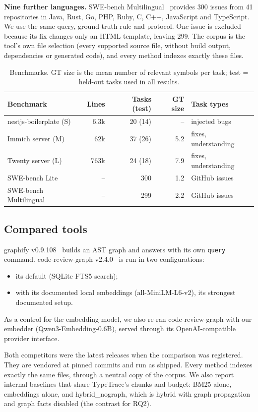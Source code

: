 \documentclass[sigconf,nonacm]{acmart}
\newcommand{\tool}{TypeTrace\xspace}
\newcommand{\gfy}{graphify\xspace}
\newcommand{\crg}{code-review-graph\xspace}
\newcommand{\hyb}{\textsf{hybrid}\xspace}
\newcommand{\nog}{\textsf{hybrid\_nograph}\xspace}
\begin{document}
\textbf{Nine further languages.} SWE-bench Multilingual~\cite{yang2025swesmith} provides 300 issues from 41 repositories in Java, Rust, Go, PHP, Ruby, C, C++, JavaScript and TypeScript. We use the same query, ground-truth rule and protocol. One issue is excluded because its fix changes only an HTML template, leaving 299. The corpus is the tool's own file selection (every supported source file, without build output, dependencies or generated code), and every method indexes exactly these files.

\begin{table}[t]
\caption{Benchmarks. GT size is the mean number of relevant symbols per task; test = held-out tasks used in all results.}
\label{tab:benchmarks}
\small
\begin{tabular}{@{}lrrrl@{}}
\toprule
Benchmark & Lines & Tasks (test) & GT size & Task types \\
\midrule
nestjs-boilerplate (S) & 6.3k & 20 (14) & -- & injected bugs \\
Immich server (M) & 62k & 37 (26) & 5.2 & fixes, understanding \\
Twenty server (L) & 763k & 24 (18) & 7.9 & fixes, understanding \\
SWE-bench Lite & -- & 300 & 1.2 & GitHub issues \\
SWE-bench Multilingual & -- & 299 & 2.2 & GitHub issues \\
\bottomrule
\end{tabular}
\end{table}

\subsection{Compared tools}

\gfy v0.9.108~\cite{graphify} builds an AST graph and answers with its own \texttt{query} command. \crg v2.4.0~\cite{crg} is run in two configurations:
\begin{itemize}
\item its default (SQLite FTS5 search);
\item with its documented local embeddings (all-MiniLM-L6-v2), its strongest documented setup.
\end{itemize}
As a control for the embedding model, we also re-ran \crg with our embedder (Qwen3-Embedding-0.6B), served through its OpenAI-compatible provider interface.

Both competitors were the latest releases when the comparison was registered. They are vendored at pinned commits and run as shipped. Every method indexes exactly the same files, through a neutral copy of the corpus. We also report internal baselines that share \tool's chunks and budget: BM25 alone, embeddings alone, and \nog, which is \hyb with graph propagation and graph facts disabled (the contrast for RQ2).
\end{document}
